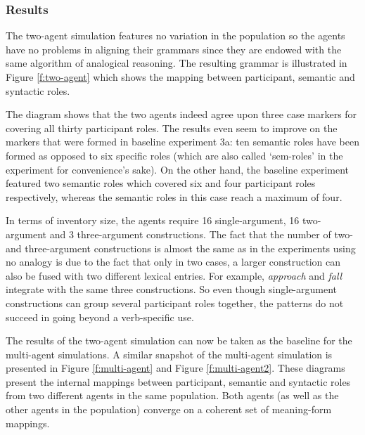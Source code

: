 \subsubsection{Results}
 The two-agent simulation features no variation in the population so the agents have no problems in aligning their grammars since they are endowed with the same algorithm of analogical reasoning. The resulting grammar is illustrated in Figure \ref{f:two-agent} which shows the mapping between participant, semantic and syntactic roles.

The diagram shows that the two agents indeed agree upon three case markers for covering all thirty participant roles. The results even seem to improve on the markers that were formed in baseline experiment 3a: ten semantic roles have been formed as opposed to six specific roles (which are also called `sem-roles' in the experiment for convenience's sake). On the other hand, the baseline experiment featured two semantic roles which covered six and four participant roles respectively, whereas the semantic roles in this case reach a maximum of four.

In terms of inventory size, the agents require 16 single-argument, 16 two-argument and 3 three-argument constructions. The fact that the number of two- and three-argument constructions is almost the same as in the experiments using no analogy is due to the fact that only in two cases, a larger construction can also be fused with two different lexical entries. For example, {\em approach} and {\em fall} integrate with the same three constructions. So even though single-argument constructions can group several participant roles together, the patterns do not succeed in going beyond a verb-specific use.

The results of the two-agent simulation can now be taken as the baseline for the multi-agent simulations. A similar snapshot of the multi-agent simulation is presented in Figure \ref{f:multi-agent} and Figure \ref{f:multi-agent2}. These diagrams present the internal mappings between participant, semantic and syntactic roles from two different agents in the same population. Both agents (as well as the other agents in the population) converge on a coherent set of meaning-form mappings.

